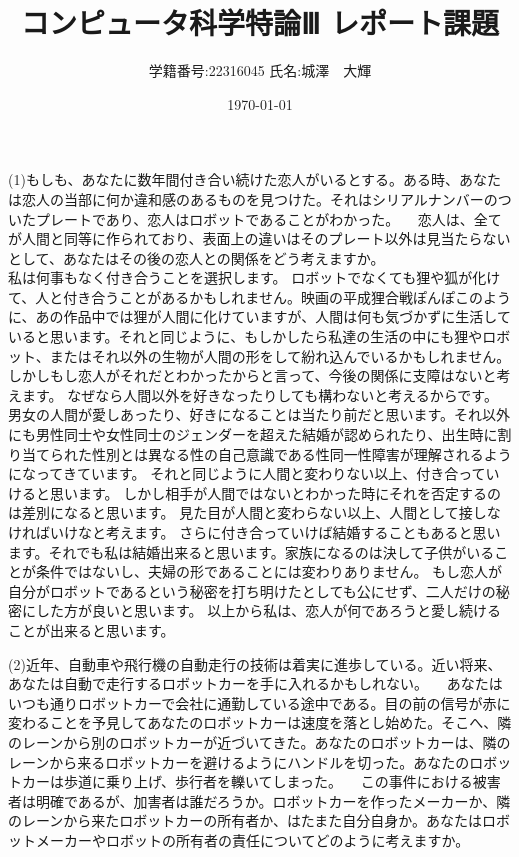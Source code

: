\documentclass[11pt,a4paper]{jsarticle}
\title{コンピュータ科学特論Ⅲ レポート課題}
\author{学籍番号:22316045 
氏名:城澤　大輝}
\date{\today}
\begin{document}
\maketitle

(1)もしも、あなたに数年間付き合い続けた恋人がいるとする。ある時、あなたは恋人の当部に何か違和感のあるものを見つけた。それはシリアルナンバーのついたプレートであり、恋人はロボットであることがわかった。
　恋人は、全てが人間と同等に作られており、表面上の違いはそのプレート以外は見当たらないとして、あなたはその後の恋人との関係をどう考えますか。\\


私は何事もなく付き合うことを選択します。
ロボットでなくても狸や狐が化けて、人と付き合うことがあるかもしれません。映画の平成狸合戦ぽんぽこのように、あの作品中では狸が人間に化けていますが、人間は何も気づかずに生活していると思います。それと同じように、もしかしたら私達の生活の中にも狸やロボット、またはそれ以外の生物が人間の形をして紛れ込んでいるかもしれません。しかしもし恋人がそれだとわかったからと言って、今後の関係に支障はないと考えます。
なぜなら人間以外を好きなったりしても構わないと考えるからです。
男女の人間が愛しあったり、好きになることは当たり前だと思います。それ以外にも男性同士や女性同士のジェンダーを超えた結婚が認められたり、出生時に割り当てられた性別とは異なる性の自己意識である性同一性障害が理解されるようになってきています。
それと同じように人間と変わりない以上、付き合っていけると思います。
しかし相手が人間ではないとわかった時にそれを否定するのは差別になると思います。
見た目が人間と変わらない以上、人間として接しなければいけなと考えます。
さらに付き合っていけば結婚することもあると思います。それでも私は結婚出来ると思います。家族になるのは決して子供がいることが条件ではないし、夫婦の形であることには変わりありません。
もし恋人が自分がロボットであるという秘密を打ち明けたとしても公にせず、二人だけの秘密にした方が良いと思います。
以上から私は、恋人が何であろうと愛し続けることが出来ると思います。

\newpage

(2)近年、自動車や飛行機の自動走行の技術は着実に進歩している。近い将来、あなたは自動で走行するロボットカーを手に入れるかもしれない。
　あなたはいつも通りロボットカーで会社に通勤している途中である。目の前の信号が赤に変わることを予見してあなたのロボットカーは速度を落とし始めた。そこへ、隣のレーンから別のロボットカーが近づいてきた。あなたのロボットカーは、隣のレーンから来るロボットカーを避けるようにハンドルを切った。あなたのロボットカーは歩道に乗り上げ、歩行者を轢いてしまった。
　この事件における被害者は明確であるが、加害者は誰だろうか。ロボットカーを作ったメーカーか、隣のレーンから来たロボットカーの所有者か、はたまた自分自身か。あなたはロボットメーカーやロボットの所有者の責任についてどのように考えますか。\\
 
\end{document}
